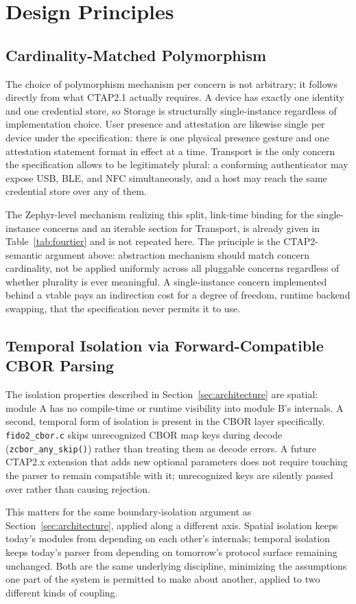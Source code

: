 
\section{Design Principles}
\label{sec:design-principles}

\subsection{Cardinality-Matched Polymorphism}
\label{subsec:design-cardinality}

The choice of polymorphism mechanism per concern is not arbitrary; it follows directly from what CTAP2.1 actually requires. A device has exactly one identity and one credential store, so Storage is structurally single-instance regardless of implementation choice. User presence and attestation are likewise single per device under the specification: there is one physical presence gesture and one attestation statement format in effect at a time. Transport is the only concern the specification allows to be legitimately plural: a conforming authenticator may expose USB, BLE, and NFC simultaneously, and a host may reach the same credential store over any of them.

The Zephyr-level mechanism realizing this split, link-time binding for the single-instance concerns and an iterable section for Transport, is already given in Table~\ref{tab:fourtier} and is not repeated here. The principle is the CTAP2-semantic argument above: abstraction mechanism should match concern cardinality, not be applied uniformly across all pluggable concerns regardless of whether plurality is ever meaningful. A single-instance concern implemented behind a vtable pays an indirection cost for a degree of freedom, runtime backend swapping, that the specification never permits it to use.

\subsection{Temporal Isolation via Forward-Compatible CBOR Parsing}
\label{subsec:design-temporal}

The isolation properties described in Section~\ref{sec:architecture} are spatial: module A has no compile-time or runtime visibility into module B's internals. A second, temporal form of isolation is present in the CBOR layer specifically. \texttt{fido2\_cbor.c} skips unrecognized CBOR map keys during decode (\texttt{zcbor\_any\_skip()}) rather than treating them as decode errors. A future CTAP2.x extension that adds new optional parameters does not require touching the parser to remain compatible with it; unrecognized keys are silently passed over rather than causing rejection.

This matters for the same boundary-isolation argument as Section~\ref{sec:architecture}, applied along a different axis. Spatial isolation keeps today's modules from depending on each other's internals; temporal isolation keeps today's parser from depending on tomorrow's protocol surface remaining unchanged. Both are the same underlying discipline, minimizing the assumptions one part of the system is permitted to make about another, applied to two different kinds of coupling.